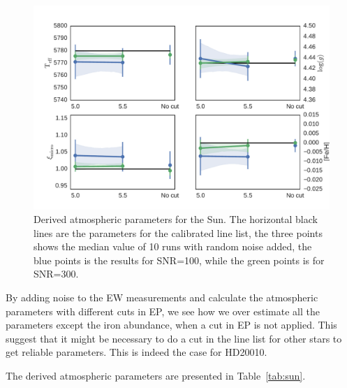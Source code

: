 \documentclass{aa}
\begin{document}
\begin{figure}[t!]
    \centering
    \includegraphics[width=0.9\linewidth]{figures/solar_parameters_10runs.pdf}
    \caption{Derived atmospheric parameters for the Sun. The horizontal
    black lines are the parameters for the calibrated line list, the
    three points shows the median value of 10 runs with random noise
    added, the blue points is the results for SNR=100, while the
    green points is for SNR=300.}
    \label{fig:solar_parameters}
\end{figure}

By adding noise to the EW measurements and calculate the atmospheric
parameters with different cuts in EP, we see how we over estimate all
the parameters except the iron abundance, when a cut in EP is not
applied. This suggest that it might be necessary to do a cut in the line
list for other stars to get reliable parameters. This is indeed the case
for HD20010.

The derived atmospheric parameters are presented in Table~\ref{tab:sun}.
\end{document}
